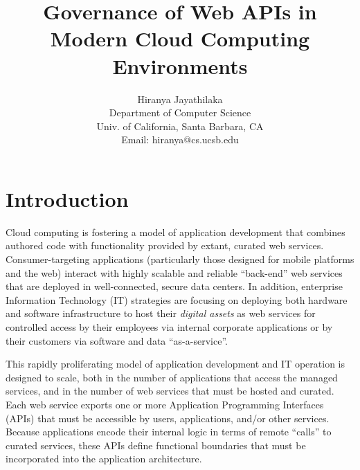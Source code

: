 \documentclass[10pt]{article}
\begin{document}
\date{}

\title{Governance of Web APIs in Modern Cloud Computing Environments}

\author{Hiranya Jayathilaka\\
Department of Computer Science\\
Univ. of California, Santa Barbara, CA\\
Email: hiranya@cs.ucsb.edu
}
\maketitle

\section{Introduction}
Cloud computing is fostering a model of 
application development that combines authored code with functionality
provided by extant, curated web services.  Consumer-targeting applications 
(particularly those designed for mobile platforms and the web) interact with highly
scalable and reliable ``back-end'' web services that are deployed
in well-connected, secure data centers.  In addition, enterprise
Information Technology (IT) strategies are focusing on deploying both hardware
and software infrastructure to host their {\em digital assets} as
web services for controlled
access by their employees via internal corporate applications or
by their customers via software and data ``as-a-service''.

This rapidly proliferating model of application development and IT operation
is designed to scale, both in the number of applications that access the
managed services, and in the number of web services that must be
hosted and curated.  Each web service exports one or more Application Programming
Interfaces (APIs) that must be accessible by users, applications, and/or
other services.
Because applications encode their internal logic in terms of
remote ``calls'' to curated services,
these APIs define functional boundaries that must be incorporated into the
application architecture.  

\end{document}
